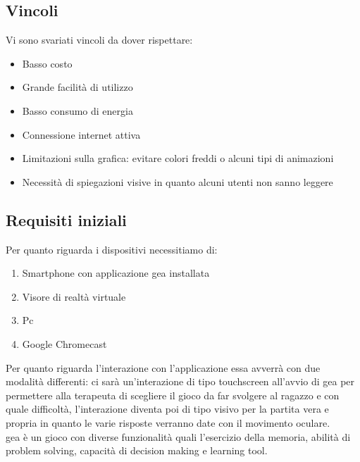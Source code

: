 \subsection{Vincoli} \label{subsec:vincoli}
Vi sono svariati vincoli da dover rispettare:
\begin{itemize}
\item Basso costo
\item Grande facilità di utilizzo
\item Basso consumo di energia
\item Connessione internet attiva
\item Limitazioni sulla grafica: evitare colori freddi o alcuni tipi di animazioni
\item Necessità di spiegazioni visive in quanto alcuni utenti non sanno leggere
\end{itemize}


\subsection{Requisiti iniziali} \label{subsec:requis}
Per quanto riguarda i dispositivi necessitiamo di:
\begin{enumerate}
\item Smartphone con applicazione \acs{gea} installata
\item Visore di realtà virtuale
\item Pc
\item Google Chromecast
\end{enumerate}

Per quanto riguarda l'interazione con l'applicazione essa avverrà con due modalità differenti: ci sarà un'interazione di tipo touchscreen all'avvio di \acs{gea} per permettere alla terapeuta di scegliere il gioco da far svolgere al ragazzo e con quale difficoltà, l'interazione diventa poi di tipo visivo per la partita vera e propria in quanto le varie risposte verranno date con il movimento oculare.\\

\acs{gea} è un gioco con diverse funzionalità quali l'esercizio della memoria, abilità di problem solving, capacità di decision making e learning tool.

